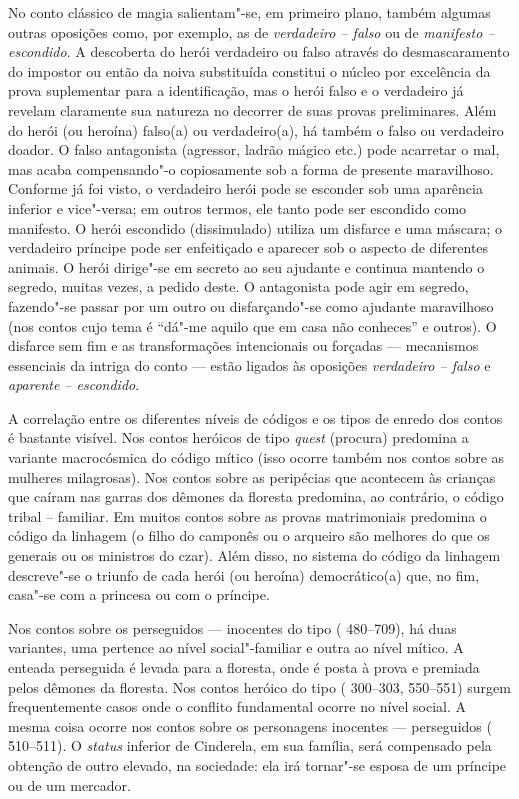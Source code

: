 No conto clássico de magia salientam"-se, em primeiro plano, também
algumas outras oposições como, por exemplo, as de \emph{verdadeiro --
falso} ou de \emph{manifesto -- escondido}. A descoberta do herói verdadeiro
ou falso através do desmascaramento do impostor ou então da noiva
substituída constitui o núcleo por excelência da prova suplementar para
a identificação, mas o herói falso e o verdadeiro já revelam claramente
sua natureza no decorrer de suas provas preliminares. Além do herói (ou
heroína) falso(a) ou verdadeiro(a), há também o falso ou verdadeiro
doador. O falso antagonista (agressor, ladrão mágico etc.) pode
acarretar o mal, mas acaba compensando"-o copiosamente sob a forma de
presente maravilhoso. Conforme já foi visto, o verdadeiro herói pode se
esconder sob uma aparência inferior e vice"-versa; em outros termos, ele
tanto pode ser escondido como manifesto. O herói escondido (dissimulado)
utiliza um disfarce e uma máscara; o verdadeiro príncipe pode ser
enfeitiçado e aparecer sob o aspecto de diferentes animais. O herói
dirige"-se em secreto ao seu ajudante e continua mantendo o segredo,
muitas vezes, a pedido deste. O antagonista pode agir em segredo,
fazendo"-se passar por um outro ou disfarçando"-se como ajudante
maravilhoso (nos contos cujo tema é ``dá"-me aquilo que em casa não
conheces'' e outros). O disfarce sem fim e as transformações
intencionais ou forçadas --- mecanismos essenciais da intriga do conto ---
estão ligados às oposições \emph{verdadeiro -- falso} e \emph{aparente -- escondido}.

A correlação entre os diferentes níveis de códigos e os tipos de enredo
dos contos é bastante visível. Nos contos heróicos de
tipo \emph{quest} (procura) predomina a variante macrocósmica do código
mítico (isso ocorre também nos contos sobre as mulheres milagrosas). Nos
contos sobre as peripécias que acontecem às crianças que caíram nas
garras dos dêmones da floresta predomina, ao contrário, o código tribal
-- familiar. Em muitos contos sobre as provas matrimoniais predomina o
código da linhagem (o filho do camponês ou o arqueiro são melhores do
que os generais ou os ministros do czar). Além disso, no sistema do
código da linhagem descreve"-se o triunfo de cada herói (ou heroína)
democrático(a) que, no fim, casa"-se com a princesa ou com o príncipe.

Nos contos sobre os perseguidos --- inocentes do tipo ( 480--709), há
duas variantes, uma pertence ao nível social"-familiar e outra ao nível
mítico. A enteada perseguida é levada para a floresta, onde é posta à
prova e premiada pelos dêmones da floresta. Nos contos heróico do tipo
( 300--303, 550--551) surgem frequentemente casos onde o conflito
fundamental ocorre no nível social. A mesma coisa ocorre nos contos
sobre os personagens inocentes --- perseguidos ( 510--511).
O \emph{status} inferior de Cinderela, em sua família, será compensado
pela obtenção de outro elevado, na sociedade: ela irá tornar"-se esposa
de um príncipe ou de um mercador.

